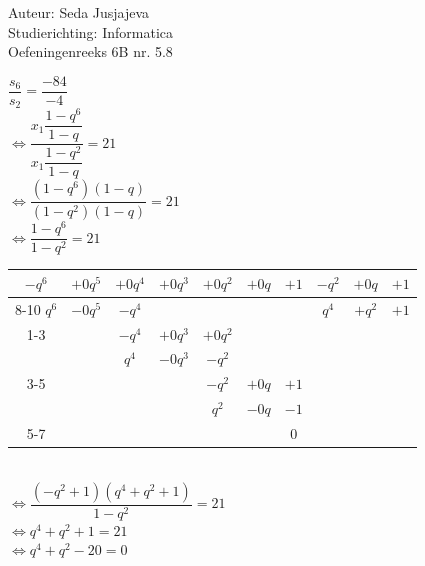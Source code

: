 \documentclass[a4paper]{article}
\begin{document}
\noindent \large Auteur: Seda Jusjajeva\\
\noindent \large Studierichting: Informatica\\
\noindent \large Oefeningenreeks 6B nr. 5.8\\

\medskip

\normalsize


$\dfrac{s_6}{s_2} = \dfrac{-84}{-4}$ \\

$\Leftrightarrow \dfrac{x_1\dfrac{1 - q^6}{1 - q}}{x_1\dfrac{1 - q^2}{1 - q}} = 21$ \\

$\Leftrightarrow \dfrac{(1 - q^6)(1 - q)}{(1 - q^2)(1 - q)} = 21$ \\

$\Leftrightarrow \dfrac{1 - q^6}{1 - q^2} = 21$ \\

\begin{tabular}{ccccccc|ccc}	
  $-q^6$ & $+ 0q^5$ & $+ 0q^4$ & $+ 0q^3$ & $+ 0q^2$ & $+ 0q$ & $+ 1$ & $-q^2$ & $+ 0q$  & $+ 1$ \\ 
  \cline{8-10}
  $q^6$  & $- 0q^5$ & $- q^4$ &           &          &        &       & $q^4$  & $+ q^2$ & $+ 1$ \\
  \cline{1-3}
         &          & $- q^4$ & $+ 0q^3$  & $+ 0q^2$ &        &       &        &         &       \\ 
         &          & $q^4$   & $- 0q^3$  & $- q^2$  &        &       &        &         &       \\
  \cline{3-5}
         &          &         &           & $- q^2$  & $+ 0q$ & $+ 1$ &        &         &       \\
         &          &         &           & $q^2$    & $- 0q$ & $- 1$ &        &         &       \\
  \cline{5-7}
         &          &         &           &          &        & $0$   &        &         &       \\
\end{tabular} \\

$\Leftrightarrow \dfrac{(-q^2 + 1)(q^4 + q^2 + 1)}{1 - q^2} = 21$ \\

$\Leftrightarrow q^4 + q^2 + 1 = 21$ \\

$\Leftrightarrow q^4 + q^2 - 20 = 0$ \\
\end{document}
